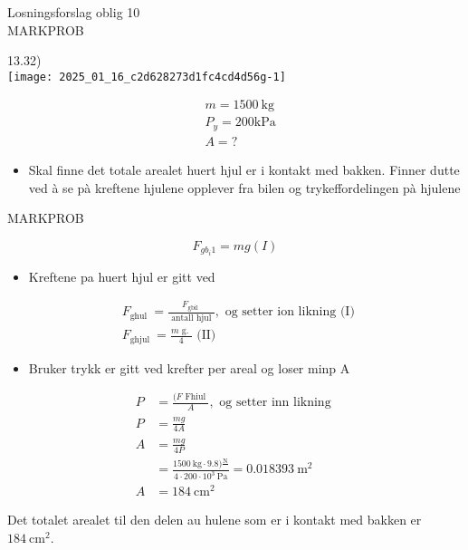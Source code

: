 \documentclass[10pt]{article}
\begin{document}
Losningsforslag oblig 10\\

MARKPROB

13.32)\\
\texttt{[image: 2025\_01\_16\_c2d628273d1fc4cd4d56g-1]}

$$
\begin{aligned}
& m=1500 \mathrm{~kg} \\
& P_{y}=200 \mathrm{kPa} \\
& A=?
\end{aligned}
$$

\begin{itemize}
  \item Skal finne det totale arealet huert hjul er i kontakt med bakken. Finner dutte ved à se pà kreftene hjulene opplever fra bilen og trykeffordelingen pà hjulene
\end{itemize}

MARKPROB

$$
F_{g b_{i} 1}=m g(I)
$$

\begin{itemize}
  \item Kreftene pa huert hjul er gitt ved
\end{itemize}


\begin{align*}
& F_{\text {ghul }}=\frac{F_{\text {gbil }}}{\text { antall hjul }}, \text { og setter ion likning (I) } \\
& F_{\text {ghjul }}=\frac{m \text { g. }}{4} \text { (II) } \tag{II}
\end{align*}


\begin{itemize}
  \item Bruker trykk er gitt ved krefter per areal og loser minp A
\end{itemize}

$$
\begin{aligned}
P & =\frac{(F \text { Fhiul }}{A}, \text { og setter inn likning } \\
P & =\frac{m g}{4 A} \\
A & =\frac{m g}{4 P} \\
& =\frac{1500 \mathrm{~kg} \cdot 9.8) \frac{\mathrm{N}}{}}{4 \cdot 200 \cdot 10^{3} \mathrm{~Pa}}=0.018393 \mathrm{~m}^{2} \\
A & =184 \mathrm{~cm}^{2}
\end{aligned}
$$

Det totalet arealet til den delen au hulene som er i kontakt med bakken er $184 \mathrm{~cm}^{2}$.
\end{document}
